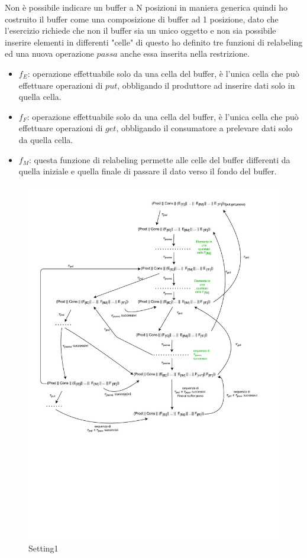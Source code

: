 \documentclass[a4paper]{article}
\begin{document}
Non è possibile indicare un buffer a N posizioni in maniera generica quindi ho costruito il buffer come una composizione di buffer ad 1 posizione, dato che l'esercizio richiede che non il buffer sia un unico oggetto e non sia possibile inserire elementi in differenti "celle" di questo ho definito tre funzioni di relabeling ed una nuova operazione $passa$ anche essa inserita nella restrizione.
\begin{itemize}
	\item $f_E$: operazione effettuabile solo da una cella del buffer, è l'unica cella che può effettuare operazioni di $put$, obbligando il produttore ad inserire dati solo in quella cella.
	\item $f_F$: operazione effettuabile solo da una cella del buffer, è l'unica cella che può effettuare operazioni di $get$, obbligando il consumatore a prelevare dati solo da quella cella.
	\item $f_M$: questa funzione di relabeling permette alle celle del buffer differenti da quella iniziale e quella finale di passare il dato verso il fondo del buffer.
\end{itemize}
\begin{figure}[!ht]
\centering
\includegraphics[width=1\textwidth]{./PA/setting1}
\caption{Setting1} \label{FIG:PA1_DG}
\end{figure}
\end{document}
